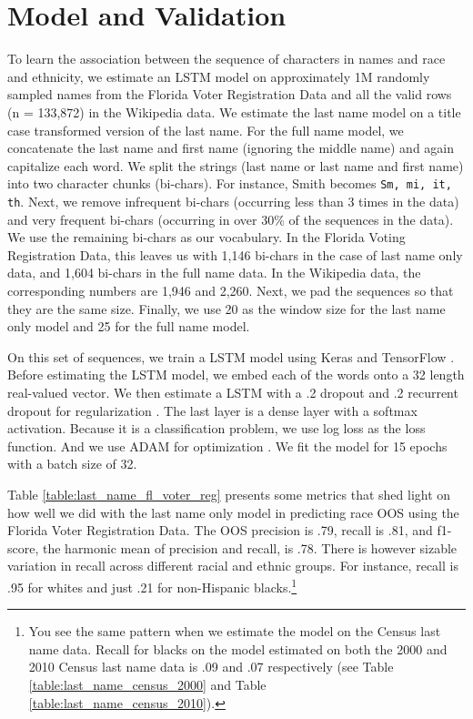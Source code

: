 \documentclass[12pt, letterpaper]{article}
\begin{document}
\section*{Model and Validation}
To learn the association between the sequence of characters in names and race and ethnicity, we estimate an LSTM model \citep{graves2005framewise, gers1999learning} on approximately 1M randomly sampled names from the Florida Voter Registration Data and all the valid rows (n = 133,872) in the Wikipedia data. We estimate the last name model on a title case transformed version of the last name. For the full name model, we concatenate the last name and first name (ignoring the middle name) and again capitalize each word. We split the strings (last name or last name and first name) into two character chunks (bi-chars). For instance, Smith becomes {\tt Sm, mi, it, th}. Next, we remove infrequent bi-chars (occurring less than 3 times in the data) and very frequent bi-chars (occurring in over 30\% of the sequences in the data). We use the remaining bi-chars as our vocabulary. In the Florida Voting Registration Data, this leaves us with 1,146 bi-chars in the case of last name only data, and 1,604 bi-chars in the full name data. In the Wikipedia data, the corresponding numbers are 1,946 and 2,260. Next, we pad the sequences so that they are the same size. Finally, we use 20 as the window size for the last name only model and 25 for the full name model. 

On this set of sequences, we train a LSTM model using Keras \citep{chollet2015keras} and TensorFlow \citep{abadi2016tensorflow}. Before estimating the LSTM model, we embed each of the words onto a 32 length real-valued vector. We then estimate a LSTM with a .2 dropout and .2 recurrent dropout for regularization \citep{srivastava2014dropout}. The last layer is a dense layer with a softmax activation. Because it is a classification problem, we use log loss as the loss function. And we use ADAM for optimization \citep{kingma2014adam}. We fit the model for 15 epochs with a batch size of 32.

Table \ref{table:last_name_fl_voter_reg} presents some metrics that shed light on how well we did with the last name only model in predicting race OOS using the Florida Voter Registration Data. The OOS precision is .79, recall is .81, and f1-score, the harmonic mean of precision and recall, is .78. There is however sizable variation in recall across different racial and ethnic groups. For instance, recall is .95 for whites and just .21 for non-Hispanic blacks.\footnote{You see the same pattern when we estimate the model on the Census last name data. Recall for blacks on the model estimated on both the 2000 and 2010 Census last name data is .09 and .07 respectively (see Table \ref{table:last_name_census_2000} and Table \ref{table:last_name_census_2010}).}
\end{document}
